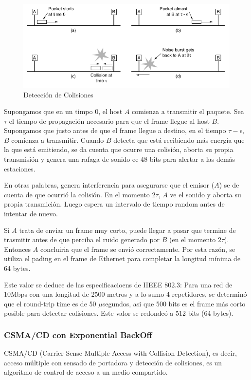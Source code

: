 \begin{figure}[H]
	\centering
	\includegraphics[width=\textwidth
]{images/deteccion-colisiones.png}
	\caption[Detección de Colisiones]{Detección de Colisiones}
	\label{fig:deteccion-colisiones}
\end{figure}

Supongamos que en un timpo 0, el host \(A\) comienza a transmitir el paquete. Sea   \(\tau\) el tiempo de propagación necesario para que el frame llegue al host \(B\). Supongamos que justo antes de que el frame llegue a destino, en el tiempo \(\tau-\epsilon\), \(B\) comienza a transmitir. Cuando \(B\) detecta que está recibiendo más energía que la que está emitiendo, se da cuenta que ocurre una colisión, aborta su propia transmisión y genera una rafaga de sonido ee 48 bits para alertar a las demás estaciones. 

En otras palabras, genera interferencia para asegurarse que el emisor (\(A\)) se de cuenta de que ocurrió la colisión. En el momento \(2\tau\), \(A\) ve el sonido y aborta su propia transmición. Luego espera un intervalo de tiempo random antes de intentar de nuevo.

Si \(A\) trata de enviar un frame muy corto, puede llegar a pasar que termine de trasmitir antes de que  perciba el ruido generado por \(B\) (en el momento \(2\tau\)). Entonces \(A\) concluiria que el frame se envió correctamente. Por esta razón, se utiliza el pading en el frame de Ethernet para completar la longitud mínima de 64 bytes.

Este valor se deduce de las especificacioens de IIEEE 802.3: Para una red de 10Mbps con una longitud de 2500 metros y a lo sumo 4 repetidores, se determinó que el round-trip time es de 50 \(\mu\)segundos, asi que 500 bits es el frame más corto posible para detectar colisiones. Este valor se redondeó a 512 bits (64 bytes).

\subsubsection{CSMA/CD con Exponential BackOff}\label{section::csma}
CSMA/CD (Carrier Sense Multiple Access with Collision Detection), es decir, acceso múltiple con sensado de portadora y detección de colisiones, es un algoritmo de control de acceso a un medio compartido.

